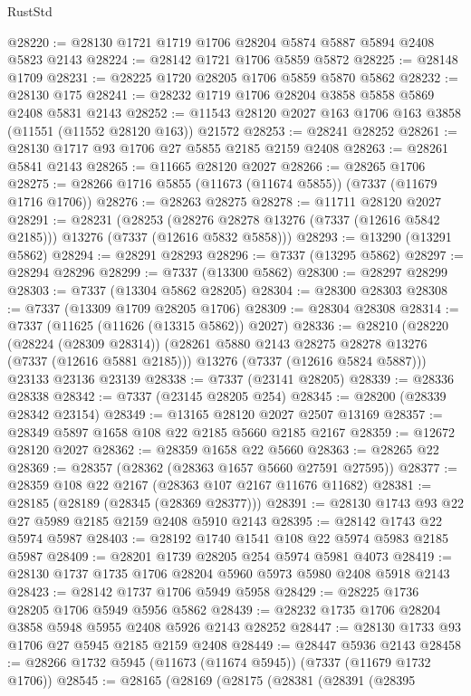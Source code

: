 \begin{lexlean}{RustStd}
\begin{coremodule}
@28220 := @28130 @1721 @1719 @1706 @28204 @5874 @5887 @5894 @2408 @5823 @2143
@28224 := @28142 @1721 @1706 @5859 @5872
@28225 := @28148 @1709
@28231 := @28225 @1720 @28205 @1706 @5859 @5870 @5862
@28232 := @28130 @175
@28241 := @28232 @1719 @1706 @28204 @3858 @5858 @5869 @2408 @5831 @2143
@28252 := @11543 @28120 @2027 @163 @1706 @163 @3858 (@11551 (@11552 @28120 @163)) @21572
@28253 := @28241 @28252
@28261 := @28130 @1717 @93 @1706 @27 @5855 @2185 @2159 @2408
@28263 := @28261 @5841 @2143
@28265 := @11665 @28120 @2027
@28266 := @28265 @1706
@28275 := @28266 @1716 @5855 (@11673 (@11674 @5855)) (@7337 (@11679 @1716 @1706))
@28276 := @28263 @28275
@28278 := @11711 @28120 @2027
@28291 := @28231
    (@28253 (@28276 @28278 @13276 (@7337 (@12616 @5842 @2185))) @13276 (@7337 (@12616 @5832 @5858)))
@28293 := @13290 (@13291 @5862)
@28294 := @28291 @28293
@28296 := @7337 (@13295 @5862)
@28297 := @28294 @28296
@28299 := @7337 (@13300 @5862)
@28300 := @28297 @28299
@28303 := @7337 (@13304 @5862 @28205)
@28304 := @28300 @28303
@28308 := @7337 (@13309 @1709 @28205 @1706)
@28309 := @28304 @28308
@28314 := @7337 (@11625 (@11626 (@13315 @5862)) @2027)
@28336 := @28210
    (@28220
      (@28224 (@28309 @28314))
      (@28261 @5880 @2143 @28275 @28278 @13276 (@7337 (@12616 @5881 @2185)))
      @13276
      (@7337 (@12616 @5824 @5887)))
    @23133
    @23136
    @23139
@28338 := @7337 (@23141 @28205)
@28339 := @28336 @28338
@28342 := @7337 (@23145 @28205 @254)
@28345 := @28200 (@28339 @28342 @23154)
@28349 := @13165 @28120 @2027 @2507 @13169
@28357 := @28349 @5897 @1658 @108 @22 @2185 @5660 @2185 @2167
@28359 := @12672 @28120 @2027
@28362 := @28359 @1658 @22 @5660
@28363 := @28265 @22
@28369 := @28357 (@28362 (@28363 @1657 @5660 @27591 @27595))
@28377 := @28359 @108 @22 @2167 (@28363 @107 @2167 @11676 @11682)
@28381 := @28185 (@28189 (@28345 (@28369 @28377)))
@28391 := @28130 @1743 @93 @22 @27 @5989 @2185 @2159 @2408 @5910 @2143
@28395 := @28142 @1743 @22 @5974 @5987
@28403 := @28192 @1740 @1541 @108 @22 @5974 @5983 @2185 @5987
@28409 := @28201 @1739 @28205 @254 @5974 @5981 @4073
@28419 := @28130 @1737 @1735 @1706 @28204 @5960 @5973 @5980 @2408 @5918 @2143
@28423 := @28142 @1737 @1706 @5949 @5958
@28429 := @28225 @1736 @28205 @1706 @5949 @5956 @5862
@28439 := @28232 @1735 @1706 @28204 @3858 @5948 @5955 @2408 @5926 @2143 @28252
@28447 := @28130 @1733 @93 @1706 @27 @5945 @2185 @2159 @2408
@28449 := @28447 @5936 @2143
@28458 := @28266 @1732 @5945 (@11673 (@11674 @5945)) (@7337 (@11679 @1732 @1706))
@28545 := @28165
    (@28169
      (@28175
        (@28381
          (@28391
            (@28395

\end{coremodule}
\end{lexlean}
